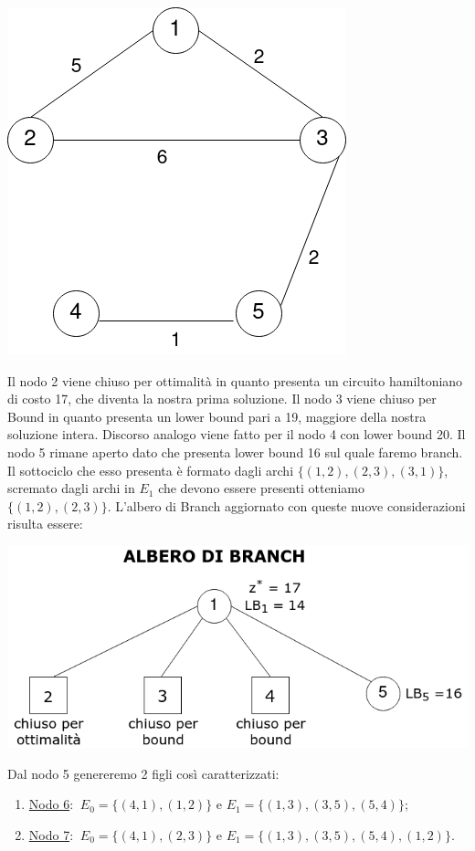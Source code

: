 \documentclass[
	article,			%
	12pt,				%
	oneside,			%
	a4paper,			%
	english,			%
	italian,				%
	sumario=tradicional,
	]{abntex2}
\begin{document}
\begin{center}
    \qquad
    \includegraphics[scale=0.25]{files/quinto1Tree.png}
\end{center}
Il nodo 2 viene chiuso per ottimalità in quanto presenta un circuito hamiltoniano di costo 17, che diventa la nostra prima soluzione. Il nodo 3 viene chiuso per Bound in quanto presenta un lower bound pari a 19, maggiore della nostra soluzione intera. Discorso analogo viene fatto per il nodo 4 con lower bound 20. Il nodo 5 rimane aperto dato che presenta lower bound 16 sul quale faremo branch. Il sottociclo che esso presenta è formato dagli archi $\{(1,2),(2,3),(3,1)\}$, scremato dagli archi in $E_1$ che devono essere presenti otteniamo $\{(1,2),(2,3)\}$.
\newline
L'albero di Branch aggiornato con queste nuove considerazioni risulta essere:
\begin{center}
    \includegraphics[scale=0.4]{files/alberoBranch2.png}
\end{center}
Dal nodo 5 genereremo 2 figli così caratterizzati:
\begin{enumerate}
    \item [] \underline{Nodo 6}: $\:E_0 = \{(4,1),(1,2)\}$ e $E_1 = \{(1,3),(3,5),(5,4)\}$;
    \item [] \underline{Nodo 7}: $\:E_0 = \{(4,1),(2,3)\}$ e $E_1 = \{(1,3),(3,5),(5,4), (1,2)\}$.
\end{enumerate}
\end{document}
